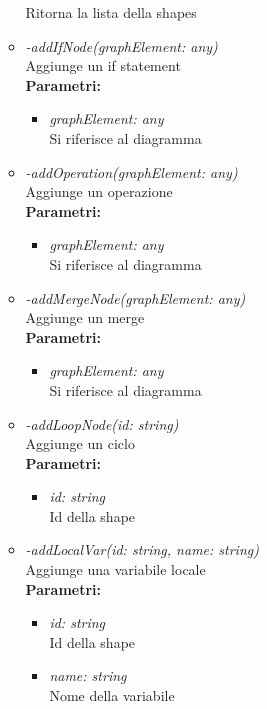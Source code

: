 \begin{itemize}
\begin{itemize}
    		Ritorna la lista della shapes
    		\item \emph{-addIfNode(graphElement: any)}\\
    		Aggiunge un if statement\\
    		\textbf{Parametri:}
    		\begin{itemize}
    			\item \emph{graphElement: any}\\
    			Si riferisce al diagramma
    		\end{itemize}
    		\item \emph{-addOperation(graphElement: any)}\\
    		Aggiunge un operazione\\
    		\textbf{Parametri:}
    		\begin{itemize}
    			\item \emph{graphElement: any}\\
    			Si riferisce al diagramma
    		\end{itemize}
    		\item \emph{-addMergeNode(graphElement: any)}\\
    		Aggiunge un merge\\
    		\textbf{Parametri:}
    		\begin{itemize}
    			\item \emph{graphElement: any}\\
    			Si riferisce al diagramma
    		\end{itemize}
    		\item \emph{-addLoopNode(id: string)}\\
    		Aggiunge un ciclo\\
    		\textbf{Parametri:}
    		\begin{itemize}
    			\item \emph{id: string}\\
    			Id della shape
    		\end{itemize}
    		\item \emph{-addLocalVar(id: string, name: string)}\\
    		Aggiunge una variabile locale\\
    		\textbf{Parametri:}
    		\begin{itemize}
    			\item \emph{id: string}\\
    			Id della shape
    			\item \emph{name: string}\\
    			Nome della variabile

\end{itemize}
\end{itemize}
\end{itemize}
